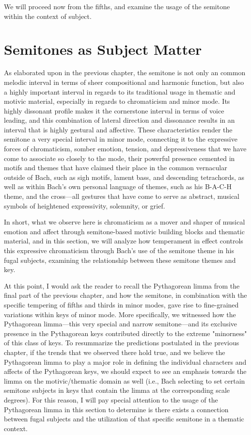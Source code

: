 We will proceed now from the fifths, and examine the usage of the
semitone within the context of subject.

    \section{Semitones as Subject Matter}\label{semitones-as-subject-matter}

As elaborated upon in the previous chapter, the semitone is not only an
common melodic interval in terms of sheer compositional and harmonic
function, but also a highly important interval in regards to its
traditional usage in thematic and motivic material, especially in
regards to chromaticism and minor mode. Its highly dissonant profile
makes it the cornerstone interval in terms of voice leading, and this
combination of lateral direction and dissonance results in an interval
that is highly gestural and affective. These characteristics render the
semitone a very special interval in minor mode, connecting it to the
expressive forces of chromaticism, somber emotion, tension, and
depressiveness that we have come to associate so closely to the mode,
their powerful presence cemented in motifs and themes that have claimed
their place in the common vernacular outside of Bach, such as sigh
motifs, lament bass, and descending tetrachords, as well as within
Bach's own personal language of themes, such as his B-A-C-H theme, and
the cross---all gestures that have come to serve as abstract,
musical symbols of heightened expressivity, solemnity, or grief.

In short, what we observe here is chromaticism as a mover and shaper of
musical emotion and affect through semitone-based motivic building
blocks and thematic material, and in this section, we will analyze how
temperament in effect controls this expressive chromaticism through
Bach's use of the semitone theme in his fugal subjects, examining the
relationship between these semitone themes and key.

At this point, I would ask the reader to recall the Pythagorean limma
from the final part of the previous chapter, and how the semitone, in
combination with the specific tempering of fifths and thirds in minor
modes, gave rise to fine-grained variations within keys of minor mode.
More specifically, we witnessed how the Pythagorean limma---this
very special and narrow semitone---and its exclusive presence in the
Pythagorean keys contributed directly to the extreme "minorness" of this
class of keys. To resummarize the predictions postulated in the previous
chapter, if the trends that we observed there hold true, and we believe
the Pythagorean limma to play a major role in defining the individual
characters and affects of the Pythagorean keys, we should expect to see
an emphasis towards the limma on the motivic/thematic domain as well
(i.e., Bach selecting to set certain semitone subjects in keys that
contain the limma at the corresponding scale degrees). For this reason,
I will pay special attention to the usage of the Pythagorean limma in
this section to determine is there exists a connection between fugal
subjects and the utilization of that specific semitone in a thematic
context.

